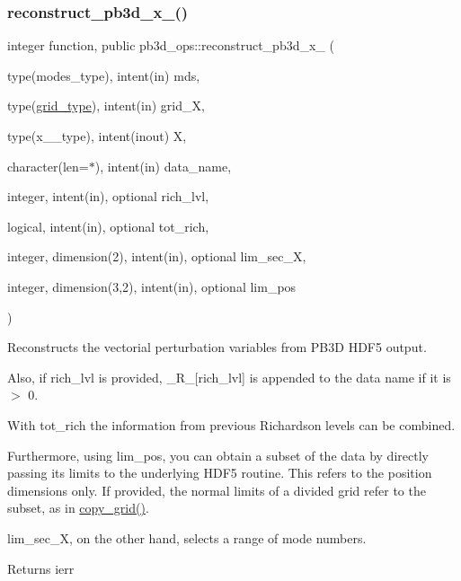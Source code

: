 \subsubsection{\texorpdfstring{reconstruct\+\_\+pb3d\+\_\+x\+\_()}{reconstruct\_pb3d\_x\_1()}}
{\footnotesize\ttfamily integer function, public pb3d\+\_\+ops\+::reconstruct\+\_\+pb3d\+\_\+x\+\_ (\begin{DoxyParamCaption}\item[{type(modes\+\_\+type), intent(in)}]{mds,  }\item[{type(\hyperlink{structgrid__vars_1_1grid__type}{grid\+\_\+type}), intent(in)}]{grid\+\_\+X,  }\item[{type(x\+\_\+1\+\_\+type), intent(inout)}]{X,  }\item[{character(len=$\ast$), intent(in)}]{data\+\_\+name,  }\item[{integer, intent(in), optional}]{rich\+\_\+lvl,  }\item[{logical, intent(in), optional}]{tot\+\_\+rich,  }\item[{integer, dimension(2), intent(in), optional}]{lim\+\_\+sec\+\_\+X,  }\item[{integer, dimension(3,2), intent(in), optional}]{lim\+\_\+pos }\end{DoxyParamCaption})}



Reconstructs the vectorial perturbation variables from P\+B3D H\+D\+F5 output. 

Also, if {\ttfamily rich\+\_\+lvl} is provided, {\ttfamily \+\_\+\+R\+\_\+\mbox{[}rich\+\_\+lvl\mbox{]}} is appended to the data name if it is $>$ 0.

With {\ttfamily tot\+\_\+rich} the information from previous Richardson levels can be combined.

Furthermore, using {\ttfamily lim\+\_\+pos}, you can obtain a subset of the data by directly passing its limits to the underlying H\+D\+F5 routine. This refers to the position dimensions only. If provided, the normal limits of a divided grid refer to the subset, as in \hyperlink{namespacegrid__utilities_a04f971c38083f873a04eb6568bed466b}{copy\+\_\+grid()}.

{\ttfamily lim\+\_\+sec\+\_\+X}, on the other hand, selects a range of mode numbers.

\begin{DoxyReturn}{Returns}
ierr
\end{DoxyReturn}

